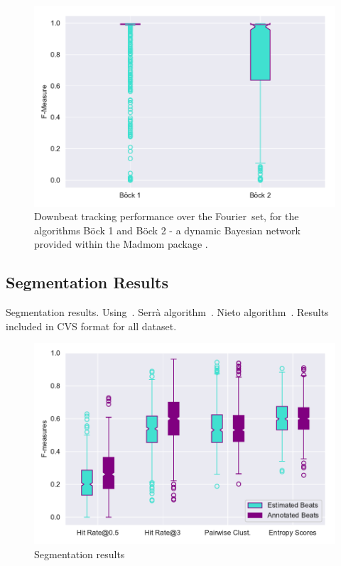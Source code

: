 \documentclass{article}
\newcommand{\setName}{Fourier}
\begin{document}
\begin{figure}
    \centerline{\includegraphics[width=\columnwidth]{figs/2019_04_09_10_27_35_Downbeat_Re_F-Measure.pdf}}
    \caption{Downbeat tracking performance over the \setName~set, for the algorithms B{\"o}ck 1 \cite{Bock2016a} and B{\"o}ck 2 - a dynamic Bayesian network provided within the Madmom package \cite{Bock2016b}.}
    \label{fig:downbeat_results}
\end{figure}

\subsection{Segmentation Results}

Segmentation results. Using~\cite{Nieto2016}. Serr\`a algorithm~\cite{Serra2014}. Nieto algorithm~\cite{Nieto2014}. Results included in CVS format for all dataset.


\begin{figure}
    \centerline{\includegraphics[width=1.1\columnwidth]{figs/segment_results.pdf}}
    \caption{Segmentation results}
    \label{fig:segment_results}
\end{figure}
\end{document}
